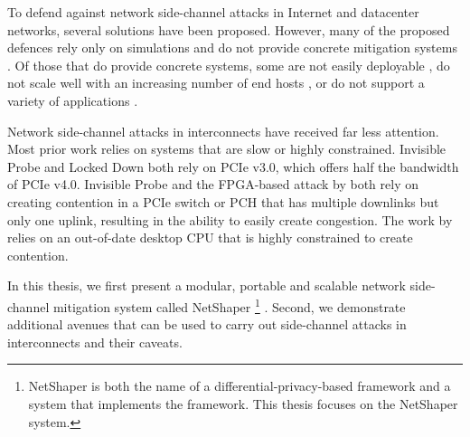 To defend against network side-channel attacks in Internet and datacenter networks, several solutions have been proposed. 
However, many of the proposed defences rely only on simulations and do not provide concrete mitigation systems \cite{abusnaina2020dfd, cai2014tamaraw, gong2022surakav, hou2020wf, juarez2016wtfpad, nasr2021blind, rahman2020mockingbird, shan2021dolos, wang2014supersequence, wright2009morphing}.
Of those that do provide concrete systems, some are not easily deployable \cite{cai2014csbuflo, mehta2022pacer, smith2022qcsd, wang2017walkie}, do not scale well with an increasing number of end hosts \cite{luo2011httpos, cai2014csbuflo, smith2022qcsd, wang2017walkie, cherubin2017llama, barradas2017deltashaper}, or do not support a variety of applications \cite{luo2011httpos, wang2017walkie, cherubin2017llama}.

Network side-channel attacks in interconnects have received far less attention.
Most prior work relies on systems that are slow or highly constrained.
Invisible Probe \cite{tan2021invisible} and Locked Down \cite{side2022lockeddown} both rely on PCIe v3.0, which offers half the bandwidth of PCIe v4.0.
Invisible Probe \cite{tan2021invisible} and the FPGA-based attack by \citet{giechaskiel2022cross} both rely on creating contention in a PCIe switch or PCH that has multiple downlinks but only one uplink, resulting in the ability to easily create congestion.
The work by \citet{khaliq2021timing} relies on an out-of-date desktop CPU that is highly constrained to create contention.

In this thesis, we first present a modular, portable and scalable network side-channel mitigation system called NetShaper 
\footnote{NetShaper is both the name of a differential-privacy-based framework and a system that implements the framework. This thesis focuses on the NetShaper system.} \cite{sabzi2024netshaper}.
Second, we demonstrate additional avenues that can be used to carry out side-channel attacks in interconnects and their caveats.

